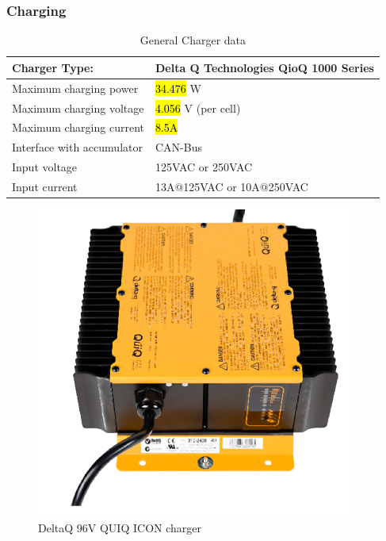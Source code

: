 \documentclass{article}
\DeclareRobustCommand{\hlr}[1]{{\sethlcolor{red}\hl{#1}}}
\begin{document}
        \subsubsection{Charging} \label{charging}


            \begin{table}[H]
                \centering
                \begin{tabular}{|l|l|}
                    \hline
                    Charger Type: & Delta Q Technologies QioQ 1000 Series \\ \hline
                    Maximum charging power & \hlr{34.476} W \\ \hline
                    Maximum charging voltage & \hlr{4.056} V (per cell) \\ \hline
                    Maximum charging current & \hlr{8.5A} \\ \hline
                    Interface with accumulator & CAN-Bus \\ \hline
                    Input voltage & 125VAC or 250VAC \\ \hline
                    Input current & 13A@125VAC or 10A@250VAC \\ \hline
                \end{tabular}
                \caption{General Charger data}
                \label{charger}
            \end{table}

            \begin{figure}[H]
                \centering
                \includegraphics[width = 0.5 \textwidth]{chargepic}
                \caption{DeltaQ 96V QUIQ ICON charger}
                \label{chargepic}
            \end{figure}
\end{document}
